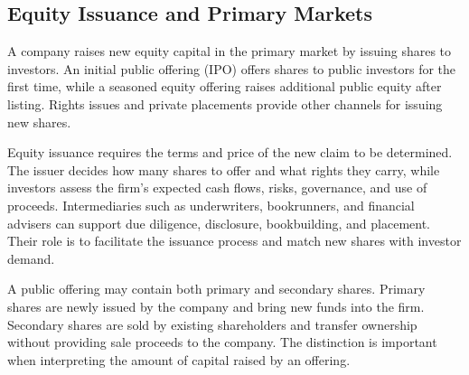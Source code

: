 \subsection{Equity Issuance and Primary Markets}

A company raises new equity capital in the primary market by issuing shares to investors. An initial public offering (IPO) offers shares to public investors for the first time, while a seasoned equity offering raises additional public equity after listing. Rights issues and private placements provide other channels for issuing new shares.

Equity issuance requires the terms and price of the new claim to be determined. The issuer decides how many shares to offer and what rights they carry, while investors assess the firm's expected cash flows, risks, governance, and use of proceeds. Intermediaries such as underwriters, bookrunners, and financial advisers can support due diligence, disclosure, bookbuilding, and placement. Their role is to facilitate the issuance process and match new shares with investor demand.

A public offering may contain both primary and secondary shares. Primary shares are newly issued by the company and bring new funds into the firm. Secondary shares are sold by existing shareholders and transfer ownership without providing sale proceeds to the company. The distinction is important when interpreting the amount of capital raised by an offering.

